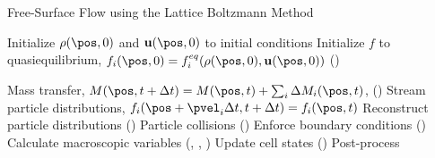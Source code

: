 \begin{algorithm}
\caption{Free-Surface Flow using the Lattice Boltzmann Method} \label{algo:free-surface-complete}
\begin{algorithmic}[1]
   
\Statex {}
\State Initialize $\rho(\pos, 0)$ and $\mathbf{u}(\pos, 0)$ to initial conditions
\State Initialize $f$ to quasiequilibrium, $f_i(\pos, 0) = f_i^{eq}(\rho(\pos, 0), \mathbf{u}(\pos, 0))$ ()

\Statex {}
\State Mass transfer, $M(\pos, t + \Delta t) = M(\pos, t) + \sum_i \Delta M_i(\pos, t)$, ()
  \Statex {}
  \State Stream particle distributions, $f_i(\pos + \pvel_i \Delta t, t + \Delta t) = f_i(\pos, t)$ 
  \State Reconstruct particle distributions ()
  \State Particle collisions ()
  \State Enforce boundary conditions ()
  \State Calculate macroscopic variables (, , )
  \State Update cell states ()
\EndFor
\Statex
\State Post-process
\EndProcedure
\end{algorithmic}
\end{algorithm}
